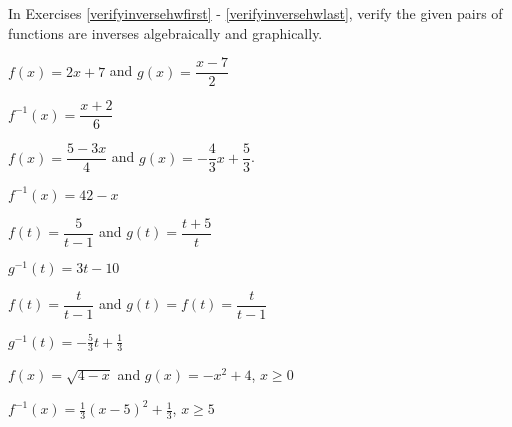 \documentclass{ximera}
\begin{document}
	\author{Stitz-Zeager}



\label{ExercisesforInverseFunctions}

In Exercises \ref{verifyinversehwfirst} - \ref{verifyinversehwlast}, verify the given pairs of functions are inverses algebraically and graphically.  




\begin{question}
$f(x) = 2x+7$ and $g(x) = \dfrac{x-7}{2}$
\begin{solution}
$f^{-1}(x) = \dfrac{x + 2}{6}$
\end{solution}

\end{question}

\begin{question}
$f(x) = \dfrac{5-3x}{4}$ and $g(x) = -\dfrac{4}{3} x + \dfrac{5}{3}$.


\begin{solution}
$f^{-1}(x) = 42-x$

\end{solution}

\end{question}

\begin{question}
$f(t) = \dfrac{5}{t-1}$ and $g(t) = \dfrac{t+5}{t}$
\begin{solution}
$g^{-1}(t) = 3t-10$
\end{solution}

\end{question}

\begin{question}
$f(t)  = \dfrac{t}{t-1}$ and $g(t) = f(t) =  \dfrac{t}{t-1}$


\begin{solution}
$g^{-1}(t)  = -\frac{5}{3} t + \frac{1}{3}$


\end{solution}

\end{question}

\begin{question}
$f(x) = \sqrt{4-x}$ and $g(x) = -x^2+4$, $x \geq 0$
\begin{solution}
$f^{-1}(x) = \frac{1}{3}(x-5)^2+\frac{1}{3}$, $x \geq 5$
\end{solution}

\end{question}
\end{document}
